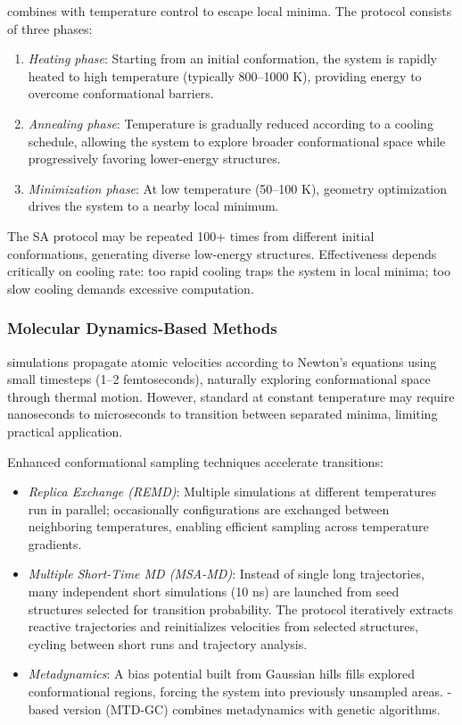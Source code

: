 \documentclass[12pt]{article}
\begin{document}
\SA combines \MD with temperature control to escape local minima. The protocol consists of three phases:

\begin{enumerate}
\item \textit{Heating phase}: Starting from an initial conformation, the system is rapidly heated to high temperature (typically 800--1000 K), providing energy to overcome conformational barriers.
\item \textit{Annealing phase}: Temperature is gradually reduced according to a cooling schedule, allowing the system to explore broader conformational space while progressively favoring lower-energy structures.
\item \textit{Minimization phase}: At low temperature (50--100 K), geometry optimization drives the system to a nearby local minimum.
\end{enumerate}

The SA protocol may be repeated 100+ times from different initial conformations, generating diverse low-energy structures. Effectiveness depends critically on cooling rate: too rapid cooling traps the system in local minima; too slow cooling demands excessive computation.

\subsubsection{Molecular Dynamics-Based Methods}

\MD simulations propagate atomic velocities according to Newton's equations using small timesteps (1--2 femtoseconds), naturally exploring conformational space through thermal motion. However, standard \MD at constant temperature may require nanoseconds to microseconds to transition between separated minima, limiting practical application.

Enhanced conformational sampling techniques accelerate transitions:

\begin{itemize}
\item \textit{Replica Exchange (REMD)}: Multiple simulations at different temperatures run in parallel; occasionally configurations are exchanged between neighboring temperatures, enabling efficient sampling across temperature gradients.
\item \textit{Multiple Short-Time MD (MSA-MD)}: Instead of single long trajectories, many independent short simulations (10 ns) are launched from seed structures selected for transition probability. The protocol iteratively extracts reactive trajectories and reinitializes velocities from selected structures, cycling between short \MD runs and trajectory analysis.
\item \textit{Metadynamics}: A bias potential built from Gaussian hills fills explored conformational regions, forcing the system into previously unsampled areas. \MC-based version (MTD-GC) combines metadynamics with genetic algorithms.
\end{itemize}
\end{document}
